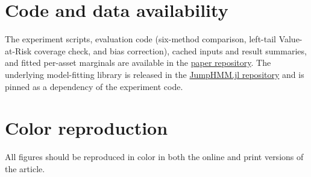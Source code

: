 \documentclass[preprint,authoryear]{elsarticle}
\begin{document}
\section*{Code and data availability}
The experiment scripts, evaluation code (six-method comparison,
left-tail Value-at-Risk coverage check, and bias correction), cached
inputs and result summaries, and fitted per-asset marginals are available in the
\href{https://github.com/varnerlab/HMM-w-jumps-paper}{paper repository}.
The underlying model-fitting library is released in the
\href{https://github.com/varnerlab/JumpHMM.jl}{JumpHMM.jl repository}
and is pinned as a dependency of the experiment code.

\section*{Color reproduction}
All figures should be reproduced in color in both the online and print
versions of the article.
\end{document}
